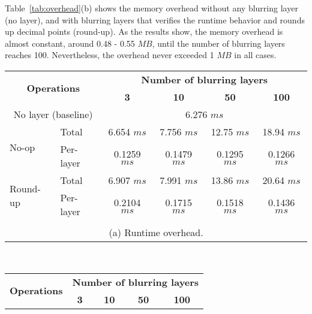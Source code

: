 Table~\ref{tab:overhead}(b) shows the memory overhead without any blurring layer 
(no layer), and with blurring layers that verifies the runtime behavior and rounds up 
decimal points (round-up). As the results show, the memory overhead is almost
constant, around 0.48 - 0.55 $MB$, until the number of blurring layers reaches 100. 
Nevertheless, the overhead never exceeded 1 $MB$ in all cases. 

\begin{table}
\scriptsize
\centering

\bgroup
\def\arraystretch{1.15}%

\begin{tabular}{|l|l|c|c|c|c|}
\hline
\multicolumn{2}{|c|}{\multirow{2}{*}{\bf Operations}} & 
\multicolumn{4}{c|}{\bf Number of blurring layers} \\\cline{3-6}
\multicolumn{2}{|c|}{} & {\bf 3} & {\bf 10} & {\bf 50} & {\bf 100}\\\hline

\multicolumn{2}{|c|}{No layer (baseline)} & \multicolumn{4}{c|}{6.276 $ms$} \\\hline

\multirow{2}{*}{No-op} & Total & 6.654 $ms$ & 7.756 $ms$ & 12.75 $ms$ & 18.94 $ms$ \\ 
& Per-layer & 0.1259 $ms$ & 0.1479 $ms$ & 0.1295 $ms$ & 0.1266 $ms$ \\\hline

\multirow{2}{*}{Round-up} & Total & 6.907 $ms$ & 7.991 $ms$  & 13.86 $ms$ & 20.64 $ms$ \\ 
& Per-layer & 0.2104 $ms$ & 0.1715 $ms$ & 0.1518 $ms$ & 0.1436 $ms$ \\\hline 
\multicolumn{6}{c}{\vspace{-0.1cm}}\\

\multicolumn{6}{c}{\small (a) Runtime overhead.} \\
\end{tabular}\\\vspace{0.25cm}


\begin{tabular}{|l|l|c|c|c|c|}
\hline
\multicolumn{2}{|c|}{\multirow{2}{*}{\bf Operations}} & 
\multicolumn{4}{c|}{\bf Number of blurring layers} \\\cline{3-6}
\multicolumn{2}{|c|}{} & {\bf 3} & {\bf 10} & {\bf 50} & {\bf 100}\\\hline


\end{tabular}
\end{table}
